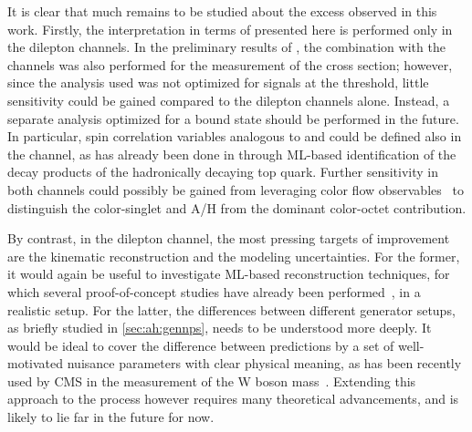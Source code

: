 


\smallskip

It is clear that much remains to be studied about the excess observed in this work. Firstly, the interpretation in terms of \etat presented here is performed only in the dilepton channels. In the preliminary results of , the combination with the \ljets channels was also performed for the measurement of the \etat cross section; however, since the \ljets analysis used was not optimized for signals at the \ttbar threshold, little sensitivity could be gained compared to the dilepton channels alone. Instead, a separate \ljets analysis optimized for a \ttbar bound state should be performed in the future. In particular, spin correlation variables analogous to \chel and \chan could be defined also in the \ljets channel, as has already been done in  through ML-based identification of the decay products of the hadronically decaying top quark.
Further sensitivity in both channels could possibly be gained from leveraging color flow observables~\cite{Gallicchio:2010sw,ATLAS:2018olo} to distinguish the color-singlet \etat and A/H from the dominant color-octet \ttbar contribution.

By contrast, in the dilepton channel, the most pressing targets of improvement are the kinematic reconstruction and the \ttbar modeling uncertainties. For the former, it would again be useful to investigate ML-based reconstruction techniques, for which several proof-of-concept studies have already been performed~\cite{Rubenach:PhD,Raine:2023fko}, in a realistic setup. For the latter, the differences between different generator setups, as briefly studied in \cref{sec:ah:gennps}, needs to be understood more deeply. It would be ideal to cover the difference between predictions by a set of well-motivated nuisance parameters with clear physical meaning, as has been recently used by CMS in the measurement of the W boson mass~\cite{CMS:SMP-23-002,Tackmann:2024kci}. Extending this approach to the \ttbar process however requires many theoretical advancements, and is likely to lie far in the future for now. 

